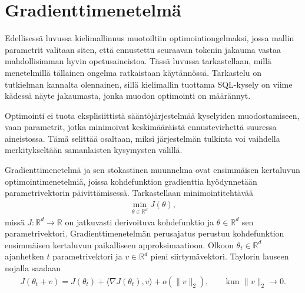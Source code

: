 \section{Gradienttimenetelmä}\label{sec:grad}

Edellisessä luvussa kielimallinnus muotoiltiin optimointiongelmaksi, jossa
mallin parametrit valitaan siten, että ennustettu seuraavan tokenin jakauma
vastaa mahdollisimman hyvin opetusaineistoa. Tässä luvussa tarkastellaan,
millä menetelmillä tällainen ongelma ratkaistaan käytännössä. Tarkastelu on
tutkielman kannalta olennainen, sillä kielimallin tuottama SQL-kysely on
viime kädessä näyte jakaumasta, jonka muodon optimointi on määrännyt.

Optimointi ei tuota eksplisiittistä sääntöjärjestelmää kyselyiden
muodostamiseen, vaan parametrit, jotka minimoivat keskimääräistä
ennustevirhettä suuressa aineistossa. Tämä selittää osaltaan, miksi
järjestelmän tulkinta voi vaihdella merkitykseltään samanlaisten
kysymysten välillä.

Gradienttimenetelmä ja sen stokastinen muunnelma ovat ensimmäisen
kertaluvun optimointimenetelmiä, joissa kohdefunktion gradienttia
hyödynnetään parametrivektorin päivittämisessä. Tarkastellaan
minimointitehtävää
\begin{align*}
  \min_{\theta \in \mathbb{R}^d} J(\theta),
\end{align*}
missä \(J : \mathbb{R}^d \to \mathbb{R}\) on jatkuvasti derivoituva
kohdefunktio ja \(\theta \in \mathbb{R}^d\) sen parametrivektori.
Gradienttimenetelmän perusajatus perustuu kohdefunktion ensimmäisen
kertaluvun paikalliseen approksimaatioon. Olkoon
\(\theta_t \in \mathbb{R}^d\) ajanhetken \(t\) parametrivektori ja
\(v \in \mathbb{R}^d\) pieni siirtymävektori. Taylorin lauseen nojalla
saadaan
\begin{align*}
  J(\theta_t + v)
  =
  J(\theta_t)
  +
  \langle \nabla J(\theta_t), v\rangle
  +
  o(\|v\|_2),
  \qquad
  \text{kun } \|v\|_2 \to 0.
\end{align*}


